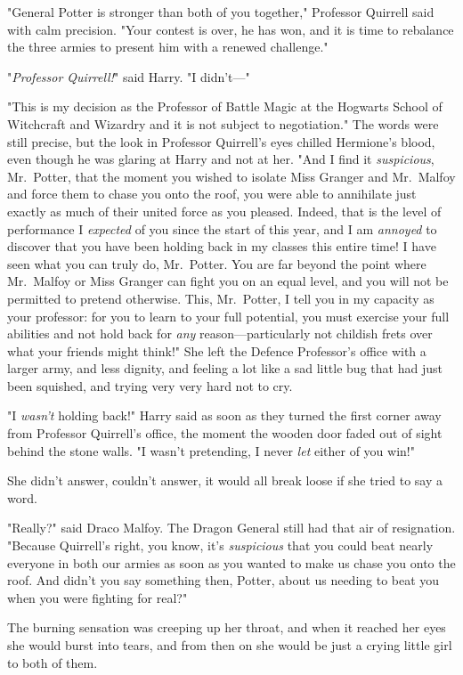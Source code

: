 "General Potter is stronger than both of you together," Professor Quirrell said
with calm precision. "Your contest is over, he has won, and it is time to
rebalance the three armies to present him with a renewed challenge."

"\emph{Professor Quirrell!}" said Harry. "I didn't---"

"This is my decision as the Professor of Battle Magic at the Hogwarts School of
Witchcraft and Wizardry and it is not subject to negotiation." The words were
still precise, but the look in Professor Quirrell's eyes chilled Hermione's
blood, even though he was glaring at Harry and not at her. "And I find it
\emph{suspicious}, Mr.~Potter, that the moment you wished to isolate Miss
Granger and Mr.~Malfoy and force them to chase you onto the roof, you were able
to annihilate just exactly as much of their united force as you pleased.
Indeed, that is the level of performance I \emph{expected} of you since the
start of this year, and I am \emph{annoyed} to discover that you have been
holding back in my classes this entire time! I have seen what you can truly do,
Mr.~Potter. You are far beyond the point where Mr.~Malfoy or Miss Granger can
fight you on an equal level, and you will not be permitted to pretend
otherwise. This, Mr.~Potter, I tell you in my capacity as your professor: for
you to learn to your full potential, you must exercise your full abilities and
not hold back for \emph{any} reason---particularly not childish frets over what
your friends might think!"
\later
She left the Defence Professor's office with a larger army, and less dignity,
and feeling a lot like a sad little bug that had just been squished, and trying
very very hard not to cry.

"I \emph{wasn't} holding back!" Harry said as soon as they turned the first
corner away from Professor Quirrell's office, the moment the wooden door faded
out of sight behind the stone walls. "I wasn't pretending, I never \emph{let}
either of you win!"

She didn't answer, couldn't answer, it would all break loose if she tried to
say a word.

"Really?" said Draco Malfoy. The Dragon General still had that air of
resignation. "Because Quirrell's right, you know, it's \emph{suspicious} that
you could beat nearly everyone in both our armies as soon as you wanted to make
us chase you onto the roof. And didn't you say something then, Potter, about us
needing to beat you when you were fighting for real?"

The burning sensation was creeping up her throat, and when it reached her eyes
she would burst into tears, and from then on she would be just a crying little
girl to both of them.

